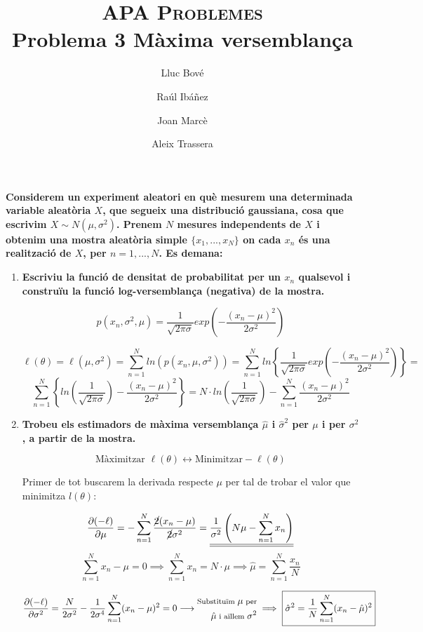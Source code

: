 \documentclass[a4paper]{article}
\title{\textsc{APA Problemes} \\ Problema 3 Màxima versemblança}
\author{Lluc Bové \and Raúl Ibáñez \and Joan Marcè \and Aleix Trassera}
\date{}
\begin{document}
\maketitle

\textbf{Considerem un experiment aleatori en què mesurem una determinada variable aleatòria $X$, que segueix una distribució gaussiana, cosa que escrivim $X \sim N(\mu, \sigma^2)$. Prenem $N$ mesures independents de $X$ i obtenim una mostra aleatòria simple $\{x_1, ..., x_N\}$ on cada $x_n$ és una realització de $X$, per $n=1,...,N$. Es demana:}

\begin{enumerate}
\item \textbf{Escriviu la funció de densitat de probabilitat per un $x_n$ qualsevol i construïu la funció log-versemblança (negativa) de la mostra.}

$$p(x_n, \sigma^2, \mu) = \frac{1}{\sqrt{2\pi\sigma}} exp\left(-\frac{(x_n - \mu)^2}{2\sigma^2}\right)$$

$$ 
\ell(\theta) = \ell(\mu,\sigma^2) = \sum_{n=1}^N ln(p(x_n, \mu, \sigma^2)) = 
\sum_{n=1}^N ln \left\{\frac{1}{\sqrt{2\pi\sigma}} exp\left(-\frac{(x_n - \mu)^2}{2\sigma^2}\right)\right\} =
$$
$$
\sum_{n=1}^N \left\{ ln \left(\frac{1}{\sqrt{2\pi\sigma}}\right) - \frac{(x_n - \mu)^2}{2\sigma^2} \right\} =
\boxed{N·ln \left(\frac{1}{\sqrt{2\pi\sigma}}\right) - \sum_{n=1}^N \frac{(x_n - \mu)^2}{2\sigma^2}}
$$

\item \textbf{Trobeu els estimadors de màxima versemblança $\hat{\mu}$ i $\hat{\sigma}^2$ per $\mu$ i per $\sigma^2$, a partir de la mostra.}

$$\text{Màximitzar } \ell(\theta) \leftrightarrow \text{Minimitzar} -\ell(\theta)$$

Primer de tot buscarem la derivada respecte $\mu$ per tal de trobar el valor que minimitza $l(\theta)$:

$$ 
\frac{\partial(-\ell)}{\partial\mu} = -\sum_{n=1}^N \frac{\cancel{2}(x_n - \mu)}{\cancel{2}\sigma^2} = 
\underline{\underline{\frac{1}{\sigma^2} \left(N\mu - \sum_{n=1}^N x_n \right)}}
$$
$$
\sum_{n=1}^N x_n - \mu = 0 \implies \sum_{n=1}^N x_n = N·\mu \implies 
\boxed{\hat{\mu} = \sum_{n=1}^N \frac{x_n}{N}}
$$ 

$$
\frac{\partial(-\ell)}{\partial\sigma^2} = \frac{N}{2\sigma^2} - \frac{1}{2\sigma^4}\sum_{n=1}^N (x_n - \mu)^2 = 0 \longrightarrow
\begin{aligned}
\footnotesize
\text{Substituïm } \mu \text{ per}\\
\footnotesize
\hat{\mu} \text{ i aïllem } \sigma^2 
\end{aligned} 
\implies \boxed{\hat{\sigma}^2 = \frac{1}{N} \sum_{n=1}^N (x_n - \hat{\mu})^2} 
$$


\end{enumerate}
\end{document}

